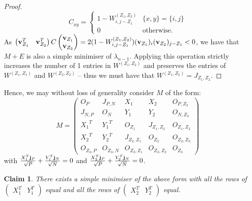 \documentclass[12pt]{article}
\newtheorem*{claim}{Claim}
\begin{document}
\begin{proof}
\begin{equation*}
    C_{xy} = \begin{cases}
        1-W^{(Z_1,Z_2)}_{i,j-Z_1} & \{x,y\} = \{i,j\}\\ 0 & \text{otherwise}.
    \end{cases}
\end{equation*}
As $\begin{pmatrix}\bold{v}_{Z_1}^T&  \bold{v}_{Z_2}^{T}\end{pmatrix} C\begin{pmatrix}\bold{v}_{Z_1} \\ \bold{v}_{Z_2}\end{pmatrix} = 2(1-W^{(Z_1,Z_2)}_{i,j-Z_1})(\bold{v}_{Z_1})_i(\bold{v}_{Z_2})_{j-Z_1}  < 0$, we have that $M+E$ is also a simple minimiser of $\lambda_{n-1}$. Applying this operation strictly increases the number of 1 entries in $W^{(Z_1, Z_2)}$ and preserves the entries of $W^{(Z_1, Z_1)}$ and $W^{(Z_2, Z_2)}$ -- thus we must have that $W^{(Z_1, Z_2)} = J_{Z_1,Z_2}$. 
\end{proof}
Hence, we may without loss of generality consider $M$ of the form:
\begin{equation*}
   M = \begin{pmatrix} O_{P} & J_{P,N} & X_1 & X_2 & O_{P,Z_3} \\ J_{N,P} & O_{N} & Y_1 & Y_2 & O_{N,Z_3}\\ {X_1}^T & {Y_1}^T & O_{Z_1} & J_{Z_1,Z_2} & O_{Z_1,Z_3} \\ {X_2}^T & {Y_2}^T & J_{Z_2,Z_1} & O_{Z_2}  & O_{Z_2,Z_3} \\ O_{Z_3,P} & O_{Z_3,N} & O_{Z_3,Z_1} & O_{Z_3,Z_2} & O_{Z_3}\end{pmatrix}
\end{equation*}
with $\frac{X_1^T \bold{j}_{P}}{\sqrt{P}} + \frac{Y_1^T \bold{j}_{N}}{\sqrt{N}} = 0$ and $\frac{X_2^T \bold{j}_{P}}{\sqrt{P}} + \frac{Y_2^T \bold{j}_{N}}{\sqrt{N}} = 0$. 
\begin{claim} There exists a simple minimiser of the above form with all the rows of $\begin{pmatrix} X_1^T & Y_1^T\end{pmatrix}$ equal and all the rows of $\begin{pmatrix} X_2^T & Y_2^T\end{pmatrix}$ equal.
\end{claim}
\end{document}
